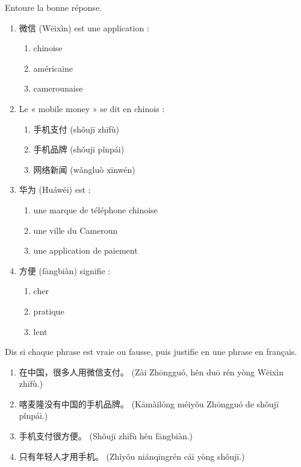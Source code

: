 \documentclass[11pt]{article}
\begin{document}
\begin{exercice}
Entoure la bonne réponse.
\begin{enumerate}
\item 微信 (Wēixìn) est une application :
\begin{enumerate}
\item chinoise \item américaine \item camerounaise
\end{enumerate}
\item Le « mobile money » se dit en chinois :
\begin{enumerate}
\item 手机支付 (shǒujī zhīfù) \item 手机品牌 (shǒujī pǐnpái) \item 网络新闻 (wǎngluò xīnwén)
\end{enumerate}
\item 华为 (Huáwéi) est :
\begin{enumerate}
\item une marque de téléphone chinoise \item une ville du Cameroun \item une application de paiement
\end{enumerate}
\item 方便 (fāngbiàn) signifie :
\begin{enumerate}
\item cher \item pratique \item lent
\end{enumerate}
\end{enumerate}
\end{exercice}

\begin{exercice}
Dis si chaque phrase est vraie ou fausse, puis justifie en une phrase en français.
\begin{enumerate}
\item 在中国，很多人用微信支付。 (Zài Zhōngguó, hěn duō rén yòng Wēixìn zhīfù.)
\item 喀麦隆没有中国的手机品牌。 (Kāmàilóng méiyǒu Zhōngguó de shǒujī pǐnpái.)
\item 手机支付很方便。 (Shǒujī zhīfù hěn fāngbiàn.)
\item 只有年轻人才用手机。 (Zhǐyǒu niánqīngrén cái yòng shǒujī.)
\end{enumerate}
\end{exercice}
\end{document}
